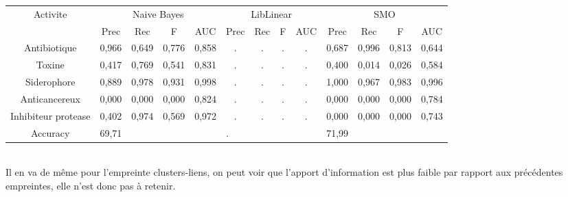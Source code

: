 \documentclass[a4paper,10pt]{report}
\begin{document}
	  \begin{flushleft}
	    \leftskip -3cm
	    \begin{tabular}{|c||c|c|c|c||c|c|c|c||c|c|c|c|}\hline
	      {Activite} & \multicolumn{4}{c||}{Naive Bayes} & \multicolumn{4}{c||}{LibLinear} & \multicolumn{4}{c|}{SMO} \\\cline{2-13}
	      & Prec & Rec & F & AUC & Prec & Rec & F & AUC & Prec & Rec & F & AUC \\\hline
	      Antibiotique & 0,966 & 0,649 & 0,776 & 0,858  & . & . & . & . & 0,687 & 0,996 & 0,813 & 0,644 \\\hline
	      Toxine & 0,417 & 0,769 & 0,541 & 0,831 & . & . & . & . & 0,400 & 0,014 & 0,026 & 0,584  \\\hline
	      Siderophore & 0,889 & 0,978 & 0,931 & 0,998 & . & . & . & . & 1,000 & 0,967 &  0,983 & 0,996  \\\hline
	      Anticancereux & 0,000 & 0,000 & 0,000 & 0,824 & . & . & . & . & 0,000 & 0,000 & 0,000 & 0,784 \\\hline
	      Inhibiteur protease & 0,402  & 0,974 & 0,569 & 0,972 & . & . & . & . & 0,000 & 0,000 & 0,000 & 0,743\\\hline
	      Accuracy & \multicolumn{4}{l||}{69,71} & \multicolumn{4}{l||}{.} & \multicolumn{4}{l|}{71,99} \\\hline
	    \end{tabular}
	     \label{table 5}
	  \end{flushleft}
	   
	   \\ Il en va de même pour l'empreinte clusters-liens, on peut voir que l'apport d'information est plus faible par rapport aux précédentes empreintes, elle n'est donc pas à retenir. 
	  
\end{document}
